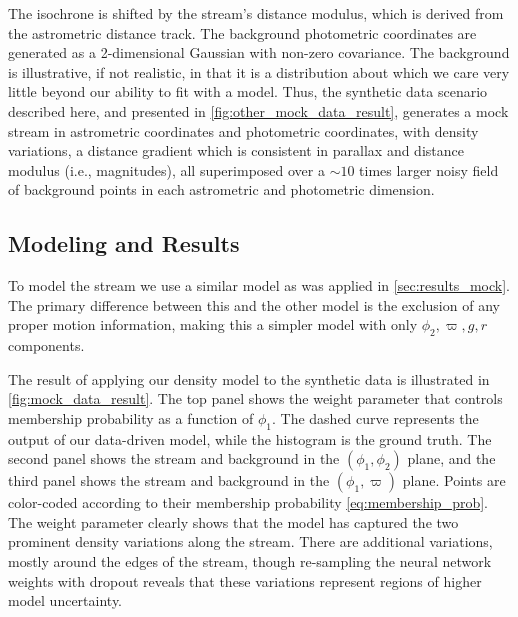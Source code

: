 \documentclass[twocolumn, linenumbers]{aastex631}
\newcommand{\parallax}{\varpi}
\begin{document}
        The isochrone is shifted by the stream's distance modulus, which is
        derived from the astrometric distance track.  The background photometric
        coordinates are generated as a 2-dimensional Gaussian with non-zero
        covariance. The background is illustrative, if not realistic, in that it
        is a distribution about which we care very little beyond our ability to
        fit with a model.  Thus, the synthetic data scenario described here, and
        presented in \autoref{fig:other_mock_data_result},
        generates a mock stream in astrometric coordinates and photometric
        coordinates, with density variations, a distance gradient which is
        consistent in parallax and distance modulus (i.e., magnitudes), all
        superimposed over a $\sim 10$ times larger noisy field of background
        points in each astrometric and photometric dimension. 


    \subsection{Modeling and Results} \label{app:mock:results}

        To model the stream we use a similar model as was applied in \autoref{sec:results_mock}. The primary difference between this and the other model is the exclusion of any proper motion information, making this a simpler model with only $\phi_2, \varpi, g, r$ components. 

        The result of applying our density model to the synthetic data is
        illustrated in \autoref{fig:mock_data_result}. The top panel shows the
        weight parameter that controls membership probability as a function of
        $\phi_1$. The dashed curve represents the output of our data-driven
        model, while the histogram is the ground truth. The second panel shows
        the stream and background in the $(\phi_1,\phi_2)$ plane, and the third
        panel shows the stream and background in the $(\phi_1,\parallax)$ plane.
        Points are color-coded according to their membership probability
        \autoref{eq:membership_prob}. The weight parameter clearly shows that
        the model has captured the two prominent density variations along the
        stream.  There are additional variations, mostly around the edges of the
        stream, though re-sampling the neural network weights with dropout
        reveals that these variations represent regions of higher model
        uncertainty. 
\end{document}
